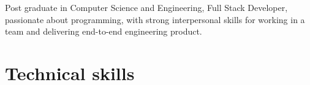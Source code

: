 \documentclass[11pt,letterpaper,sans]{moderncv}        %
\begin{document}
\pagestyle{empty}
\makecvtitle

\small{Post graduate in Computer Science and Engineering, Full Stack Developer, passionate about programming, with
strong interpersonal skills for working in a team and delivering end-to-end engineering product.}

\section{Technical skills}

\vspace{2pt}
\end{document}

